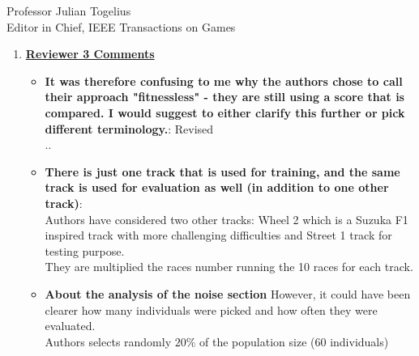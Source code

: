 \documentclass[10pt]{letter} %
\begin{document}
\begin{letter}{Professor Julian Togelius \\ Editor in Chief, IEEE Transactions on Games}
\begin{enumerate}
\begin{itemize}
{\em Thus, in this paper we are testing the best approaches we have
  found all together in an algorithm, considering a kind of
  fitnessless selection, which we have called \textit{Grand Prix
    Selection} (GPS). Although this selection uses a score that could
  be assimilated to a fitness, it's actually an extension of a
  tournament selection policy since it creates tournaments of several
  individuals, and ``scores'' them according to how they fare in these
  races. This is not actually a fitness, since it's not intrinsic to
  the individual. It's equivalent to, in a $n$-tournament selection
  that is repeated several times, giving a score of $n$ to the first,
  $n-1$ to the second, and then using this for selection. That score
  is, thus, not a fitness but actually a way of keeping track of the
  position of the individual in the different tournaments it's
  participated; since, in this context, we have no way of evaluating (
  = assigning a fitness) to a controller but only a way to compare
  them, we call this approach {\em fitnessless}, as it was called, for
  instance, in {\sc jaskowski2008winning}.}
                \end{itemize}
\item {\bf \underline{ Reviewer 3 Comments}}\\
	\begin{itemize}
	\item {\bf It was therefore confusing to me why the authors chose to call their approach "fitnessless" - they are still using a score that is compared. I would suggest to either clarify this further or pick different terminology.}: Revised\\
..
		\item {\bf	There is just one track that is used for training, and the same track is used for evaluation as well (in addition to one other track)}:\\
		Authors have considered two other tracks: Wheel 2 which is a Suzuka F1 inspired track with more challenging difficulties and Street 1 track for testing purpose.\\
		They are multiplied the races number running the  10 races for each track.
		\item {\bf	About the analysis of the noise section} However, it could have been clearer how many individuals were picked and how often they were evaluated.\\
		Authors selects randomly $20\%$ of the population size (60 individuals)
	

\end{itemize}
\end{enumerate}
\end{letter}
\end{document}
